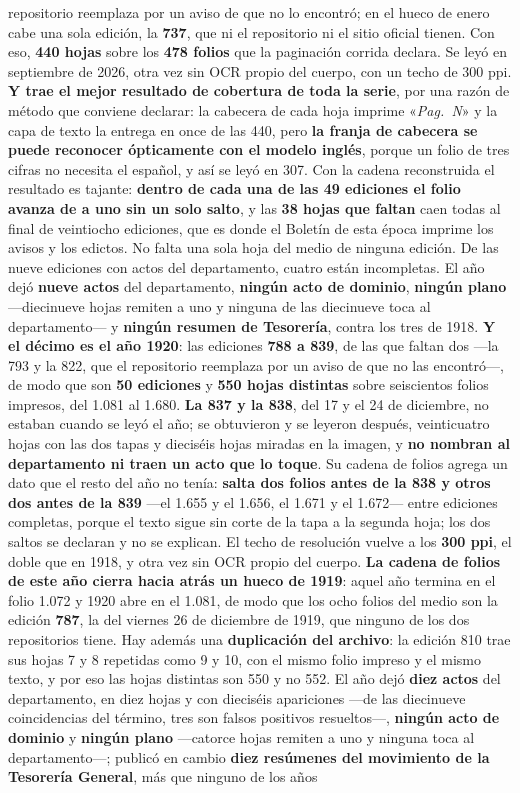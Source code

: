 repositorio reemplaza por un aviso de que no lo encontró; en el hueco de enero cabe una sola edición, la \textbf{737}, que ni el repositorio ni el sitio oficial tienen. Con eso, \textbf{440 hojas} sobre los \textbf{478 folios} que la paginación corrida declara. Se leyó en septiembre de 2026, otra vez sin OCR propio del cuerpo, con un techo de 300 ppi. \textbf{Y trae el mejor resultado de cobertura de toda la serie}, por una razón de método que conviene declarar: la cabecera de cada hoja imprime «\textit{Pag.\ N}» y la capa de texto la entrega en once de las 440, pero \textbf{la franja de cabecera se puede reconocer ópticamente con el modelo inglés}, porque un folio de tres cifras no necesita el español, y así se leyó en 307. Con la cadena reconstruida el resultado es tajante: \textbf{dentro de cada una de las 49 ediciones el folio avanza de a uno sin un solo salto}, y las \textbf{38 hojas que faltan} caen todas al final de veintiocho ediciones, que es donde el Boletín de esta época imprime los avisos y los edictos. No falta una sola hoja del medio de ninguna edición. De las nueve ediciones con actos del departamento, cuatro están incompletas. El año dejó \textbf{nueve actos} del departamento, \textbf{ningún acto de dominio}, \textbf{ningún plano} ---diecinueve hojas remiten a uno y ninguna de las diecinueve toca al departamento--- y \textbf{ningún resumen de Tesorería}, contra los tres de 1918. \textbf{Y el décimo es el año 1920}: las ediciones \textbf{788 a 839}, de las que faltan dos ---la 793 y la 822, que el repositorio reemplaza por un aviso de que no las encontró---, de modo que son \textbf{50 ediciones} y \textbf{550 hojas distintas} sobre seiscientos folios impresos, del 1.081 al 1.680. \textbf{La 837 y la 838}, del 17 y el 24 de diciembre, no estaban cuando se leyó el año; se obtuvieron y se leyeron después, veinticuatro hojas con las dos tapas y dieciséis hojas miradas en la imagen, y \textbf{no nombran al departamento ni traen un acto que lo toque}. Su cadena de folios agrega un dato que el resto del año no tenía: \textbf{salta dos folios antes de la 838 y otros dos antes de la 839} ---el 1.655 y el 1.656, el 1.671 y el 1.672--- entre ediciones completas, porque el texto sigue sin corte de la tapa a la segunda hoja; los dos saltos se declaran y no se explican. El techo de resolución vuelve a los \textbf{300 ppi}, el doble que en 1918, y otra vez sin OCR propio del cuerpo. \textbf{La cadena de folios de este año cierra hacia atrás un hueco de 1919}: aquel año termina en el folio 1.072 y 1920 abre en el 1.081, de modo que los ocho folios del medio son la edición \textbf{787}, la del viernes 26 de diciembre de 1919, que ninguno de los dos repositorios tiene. Hay además una \textbf{duplicación del archivo}: la edición 810 trae sus hojas 7 y 8 repetidas como 9 y 10, con el mismo folio impreso y el mismo texto, y por eso las hojas distintas son 550 y no 552. El año dejó \textbf{diez actos} del departamento, en diez hojas y con dieciséis apariciones ---de las diecinueve coincidencias del término, tres son falsos positivos resueltos---, \textbf{ningún acto de dominio} y \textbf{ningún plano} ---catorce hojas remiten a uno y ninguna toca al departamento---; publicó en cambio \textbf{diez resúmenes del movimiento de la Tesorería General}, más que ninguno de los años 